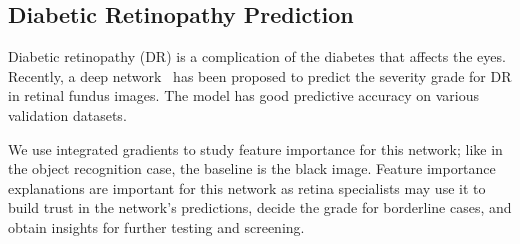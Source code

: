 

\subsection{Diabetic Retinopathy Prediction}\label{sec:app-dr}

Diabetic retinopathy (DR) is a complication of the diabetes that
affects the eyes. Recently, a deep network~\cite{jama-dr} has been proposed
to predict the severity grade for DR in retinal fundus images. The model has
good predictive accuracy on various validation datasets.

We use integrated gradients to study feature importance for this
network; like in the object recognition case, the baseline is the
black image.
Feature importance explanations are important for this network
as retina specialists may use it to
build trust in the network's predictions, decide the grade for
borderline cases, and obtain insights for further testing and
screening.

